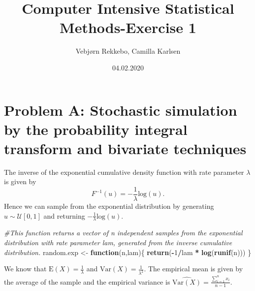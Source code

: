 \documentclass[]{article}
\title{Computer Intensive Statistical Methods-Exercise 1}
\author{Vebjørn Rekkebo, Camilla Karlsen}
\date{04.02.2020}
\newenvironment{Shaded}{\begin{snugshade}}{\end{snugshade}}
\newcommand{\CommentTok}[1]{\textcolor[rgb]{0.56,0.35,0.01}{\textit{#1}}}
\newcommand{\ControlFlowTok}[1]{\textcolor[rgb]{0.13,0.29,0.53}{\textbf{#1}}}
\newcommand{\DecValTok}[1]{\textcolor[rgb]{0.00,0.00,0.81}{#1}}
\newcommand{\KeywordTok}[1]{\textcolor[rgb]{0.13,0.29,0.53}{\textbf{#1}}}
\newcommand{\NormalTok}[1]{#1}
\newcommand{\OperatorTok}[1]{\textcolor[rgb]{0.81,0.36,0.00}{\textbf{#1}}}
\newcommand{\StringTok}[1]{\textcolor[rgb]{0.31,0.60,0.02}{#1}}
\begin{document}
\maketitle

\hypertarget{problem-a-stochastic-simulation-by-the-probability-integral-transform-and-bivariate-techniques}{%
\section{Problem A: Stochastic simulation by the probability integral
transform and bivariate
techniques}\label{problem-a-stochastic-simulation-by-the-probability-integral-transform-and-bivariate-techniques}}

The inverse of the exponential cumulative density function with rate
parameter \(\lambda\) is given by \[
F^{-1}(u) = -\frac{1}{\lambda}\text{log}(u).
\] Hence we can sample from the exponential distribution by generating
\(u\sim \mathcal{U}[0,1]\) and returning
\(-\frac{1}{\lambda}\text{log}(u)\).

\begin{Shaded}
\begin{Highlighting}[]
\CommentTok{#This function returns a vector of n independent samples from the exponential distribution with rate parameter lam, generated from the inverse cumulative distribution. }
\NormalTok{random.exp <-}\StringTok{ }\ControlFlowTok{function}\NormalTok{(n,lam)\{}
  \KeywordTok{return}\NormalTok{(}\OperatorTok{-}\DecValTok{1}\OperatorTok{/}\NormalTok{lam }\OperatorTok{*}\StringTok{ }\KeywordTok{log}\NormalTok{(}\KeywordTok{runif}\NormalTok{(n)))}
\NormalTok{\}}
\end{Highlighting}
\end{Shaded}

We know that \(\text{E}(X)=\frac{1}{\lambda}\) and
\(\text{Var}(X)=\frac{1}{\lambda^2}\). The empirical mean is given by
the average of the sample and the empirical variance is
\(\widehat{\text{Var}(X)}=\frac{\sum_{i=1}^n x_i}{n-1}\).
\end{document}
